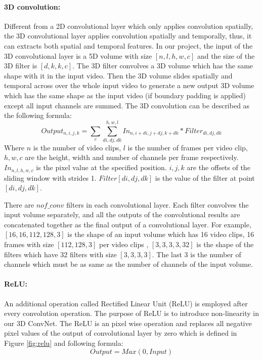 \paragraph*{3D convolution:}
\label{3dconv_filters}
Different from a 2D convolutional layer which only applies convolution spatially, the 3D  convolutional layer applies convolution spatially and temporally, thus, it can extracts both spatial and temporal features. In our project, the input of the 3D convolutional layer is a 5D volume with size \([n,l,h,w,c]\) and the size of the 3D filter is \([d,k,k,c]\). The 3D filter convolves a 3D volume which has the same shape with it in the input video. Then the 3D volume slides spatially and temporal across over the whole input video to generate a new output 3D volume which has the same shape as the input video (if boundary padding is applied) except all input channels are summed. The 3D convolution can be described as the following formula: 
\begin{equation}
	Output_{n,i,j,k} = \sum_c \sum_{di,dj,dk}^{h,w,l} In_{n, i + di, j + dj, k + dk} * Filter_{di,dj,dk}
\end{equation}
Where \(n\) is the number of video clips, \(l\) is the number of frames per video clip, \(h,w,c\) are the height, width and number of channels per frame respectively. \(In_{n,l,h,w,c}\) is the pixel value at the specified position. \(i,j,k\) are the offsets of the sliding window with strides 1. \(Filter[di,dj,dk]\) is the value of the filter at point \([di,dj,dk]\). 
\par 
There are \(nof\_conv\) filters in each convolutional layer. Each filter convolves the input volume separately, and all the outputs of the convolutional results are concatenated together as the final output of a convolutional layer. For example, \([16,16,112,128,3]\) is the shape of an input volume which has 16 video clips, 16 frames with size \([112,128,3]\) per video clips , \([3,3,3,3,32]\) is the shape of the filters which have 32 filters with size \([3,3,3,3]\). The last \(3\) is the number of channels which must be as same as the number of channels of the input volume. 

\paragraph*{ReLU:}
An additional operation called Rectified Linear Unit (ReLU) is employed after every convolution operation. The purpose of ReLU is to introduce non-linearity in our 3D ConvNet. The ReLU is an pixel wise operation and replaces all negative pixel values of the output of convolutional layer by zero which is defined in Figure \ref{fig:relu} and following formula:
\begin{equation}
Output = Max(0,Input)
\end{equation} 

